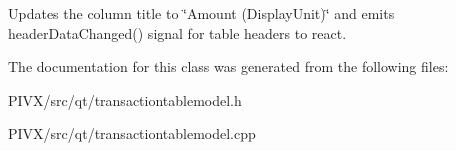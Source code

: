 Updates the column title to \char`\"{}\+Amount (\+Display\+Unit)\char`\"{} and emits header\+Data\+Changed() signal for table headers to react. 

The documentation for this class was generated from the following files\+:\begin{DoxyCompactItemize}
\item 
P\+I\+V\+X/src/qt/transactiontablemodel.\+h\item 
P\+I\+V\+X/src/qt/transactiontablemodel.\+cpp\end{DoxyCompactItemize}
